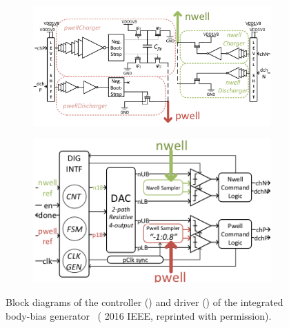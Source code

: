 \documentclass[graybox]{svmult}
\begin{document}
\begin{figure}
  \centering
  \begin{subfigure}[t]{0.9\textwidth}
  \centering
  \includegraphics[width=\textwidth]{bbgen-blockdiagram-a}
  \caption{}
  \label{fig:bbgen-blockdiagram-a}
  \end{subfigure}
  \par\bigskip
  \begin{subfigure}[t]{0.7\textwidth}
  \centering
  \includegraphics[width=\textwidth]{bbgen-blockdiagram-b}
  \caption{}
  \label{fig:bbgen-blockdiagram-b}
  \end{subfigure}
  \caption{Block diagrams of the controller () and driver () of the integrated body-bias generator~\cite{Blagojevic2016} ({\textcopyright} 2016 IEEE, reprinted with permission).}
  \label{fig:bbgen-blockdiagram}
\end{figure}
\end{document}
